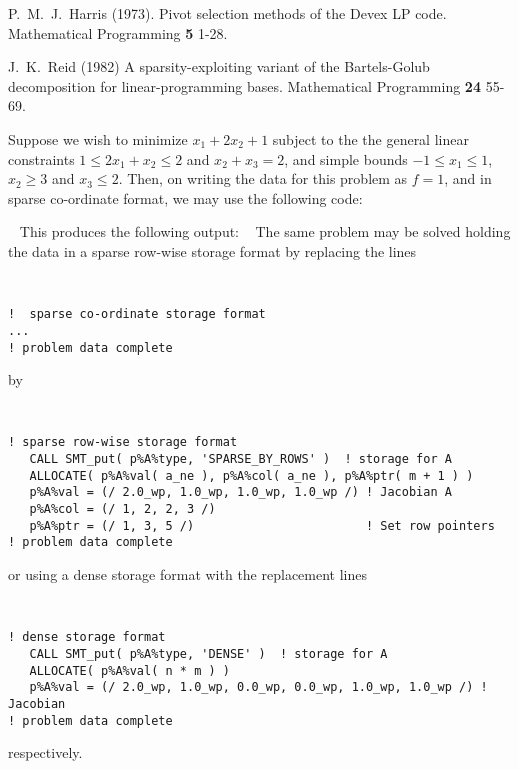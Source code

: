 \documentclass{galahad}
\begin{document}
\noindent
P.\ M.\ J.\ Harris (1973).
Pivot selection methods of the {D}evex {LP} code.
Mathematical Programming {\bf 5} 1-28.
\vspace*{1mm}

\noindent
J.\ K.\ Reid (1982)
A sparsity-exploiting variant of the {B}artels-{G}olub
decomposition for linear-programming bases.
Mathematical Programming {\bf 24} 55-69.
\vspace*{1mm}


\galexample
Suppose we wish to minimize
$x_1 + 2 x_2 + 1$
subject to the the general linear constraints
$1 \leq  2 x_{1}  +  x_{2}  \leq  2$ and
$x_{2}  +  x_{3}  =  2$, and simple bounds
$-1  \leq  x_{1}  \leq  1$, $x_2 \geq 3$ and $x_{3}  \leq  2$.
Then, on writing the data for this problem as $f = 1$,
and
in sparse co-ordinate format,
we may use the following code:

{\tt \small
\VerbatimInput{\packageexample}
}
\noindent
This produces the following output:
{\tt \small
\VerbatimInput{\packageresults}
}
\noindent
The same problem may be solved holding the data in
a sparse row-wise storage format by replacing the lines
{\tt \small
\begin{verbatim}
!  sparse co-ordinate storage format
...
! problem data complete
\end{verbatim}
}
\noindent
by
{\tt \small
\begin{verbatim}
! sparse row-wise storage format
   CALL SMT_put( p%A%type, 'SPARSE_BY_ROWS' )  ! storage for A
   ALLOCATE( p%A%val( a_ne ), p%A%col( a_ne ), p%A%ptr( m + 1 ) )
   p%A%val = (/ 2.0_wp, 1.0_wp, 1.0_wp, 1.0_wp /) ! Jacobian A
   p%A%col = (/ 1, 2, 2, 3 /)
   p%A%ptr = (/ 1, 3, 5 /)                        ! Set row pointers
! problem data complete
\end{verbatim}
}
\noindent
or using a dense storage format with the replacement lines
{\tt \small
\begin{verbatim}
! dense storage format
   CALL SMT_put( p%A%type, 'DENSE' )  ! storage for A
   ALLOCATE( p%A%val( n * m ) )
   p%A%val = (/ 2.0_wp, 1.0_wp, 0.0_wp, 0.0_wp, 1.0_wp, 1.0_wp /) ! Jacobian
! problem data complete
\end{verbatim}
}
\noindent
respectively.
\end{document}
